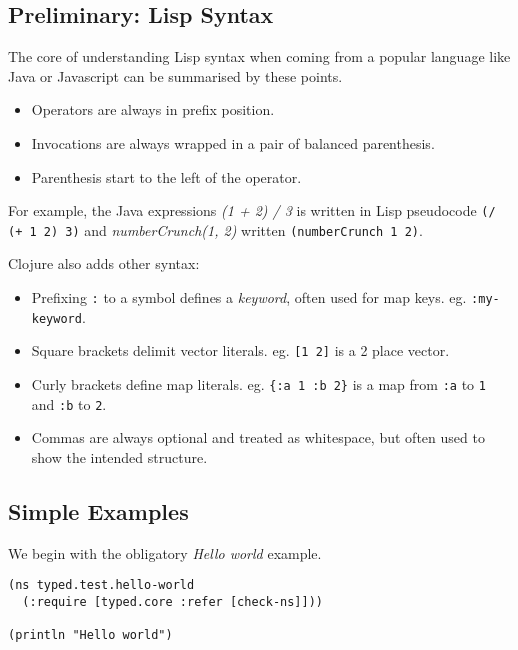 \subsection{Preliminary: Lisp Syntax}

The core of understanding Lisp syntax when coming from a popular language
like Java or Javascript can be summarised by these points.

\begin{itemize}
  \item Operators are always in prefix position.
  \item Invocations are always wrapped in a pair of balanced parenthesis.
  \item Parenthesis start to the left of the operator.
\end{itemize}

For example, the Java expressions \emph{(1 + 2) / 3} is written in Lisp pseudocode \lstinline|(/ (+ 1 2) 3)|
and \emph{numberCrunch(1, 2)} written \lstinline|(numberCrunch 1 2)|.

Clojure also adds other syntax:

\begin{itemize}
  \item Prefixing \lstinline|:| to a symbol defines a \emph{keyword}, often used for map keys. eg. \lstinline|:my-keyword|.
  \item Square brackets delimit vector literals. eg. \lstinline|[1 2]| is a 2 place vector.
  \item Curly brackets define map literals. eg. \lstinline|{:a 1 :b 2}| is a map from 
        \lstinline|:a| to \lstinline|1| and \lstinline|:b| to \lstinline|2|.
  \item Commas are always optional and treated as whitespace, but often used to show the intended structure.
\end{itemize}

\subsection{Simple Examples}

We begin with the obligatory \emph{Hello world} example.

\begin{lstlisting}[caption=Typed Hello world, label=lst:helloworld]
(ns typed.test.hello-world
  (:require [typed.core :refer [check-ns]]))

(println "Hello world")
\end{lstlisting}

